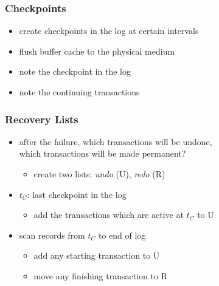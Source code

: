 \documentclass[dvipsnames]{beamer}
\theoremstyle{plain}
\begin{document}
\begin{frame}
  \frametitle{Checkpoints}

  \begin{itemize}
    \item create \alert{checkpoints} in the log at certain intervals

    \pause
    \medskip
    \item flush buffer cache to the physical medium
    \item note the checkpoint in the log
    \item note the continuing transactions
  \end{itemize}
\end{frame}

\begin{frame}
  \frametitle{Recovery Lists}

  \begin{itemize}
    \item after the failure, which transactions will be undone,\\
      which transactions will be made permanent?
    \begin{itemize}
      \item create two lists: \emph{undo} (U), \emph{redo} (R)
    \end{itemize}

    \pause
    \item $t_C$: last checkpoint in the log
    \begin{itemize}
      \item add the transactions which are active at $t_C$ to U
    \end{itemize}

    \pause
    \item scan records from $t_C$ to end of log
    \begin{itemize}
      \item add any starting transaction to U
      \item move any finishing transaction to R
    \end{itemize}
  \end{itemize}
\end{frame}
\end{document}
